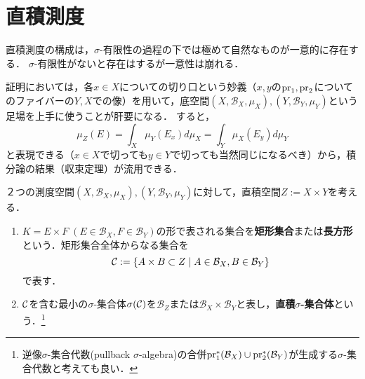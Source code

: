 \documentclass[uplatex, dvipdfmx]{jsreport}
\renewcommand{\B}{\mathcal{B}}
\begin{document}
\section{直積測度}

\begin{tcolorbox}[colframe=ForestGreen, colback=ForestGreen!10!white,breakable,colbacktitle=ForestGreen!40!white,coltitle=black,fonttitle=\bfseries\sffamily,
title=直積測度を積分形で捉える]
    直積測度の構成は，$\sigma$-有限性の過程の下では極めて自然なものが一意的に存在する．
    $\sigma$-有限性がないと存在はするが一意性は崩れる．

    証明においては，各$x\in X$についての切り口という妙義（$x,y$の$\mathrm{pr}_1,\mathrm{pr}_2$についてのファイバーの$Y,X$での像）を用いて，底空間$(X,\B_X,\mu_X),(Y,\B_Y,\mu_Y)$という足場を上手に使うことが肝要になる．
    すると，
    \[\mu_Z(E)=\int_X\mu_Y(E_x)d\mu_X=\int_Y\mu_X(E_y)d\mu_Y\]
    と表現できる（$x\in X$で切っても$y\in Y$で切っても当然同じになるべき）から，積分論の結果（収束定理）が流用できる．
\end{tcolorbox}

\begin{definition}
    ２つの測度空間$(X,\B_X,\mu_X),(Y,\B_Y,\mu_Y)$に対して，直積空間$Z:=X\times Y$を考える．
    \begin{enumerate}
        \item $K=E\times F\;(E\in\B_X,F\in\B_Y)$の形で表される集合を\textbf{矩形集合}または\textbf{長方形}という．矩形集合全体からなる集合を\[\cC:=\Brace{A\times B\subset Z\mid A\in\B_X,B\in\B_Y}\]で表す．
        \item $\mathcal{C}$を含む最小の$\sigma$-集合体$\sigma(\mathcal{C})$を$\B_Z$または$\B_X\times\B_Y$と表し，\textbf{直積$\sigma$-集合体}という．\footnote{逆像$\sigma$-集合代数(pullback $\sigma$-algebra)の合併$\pr_1^*(\B_X)\cup\pr_2^*(\B_Y)$が生成する$\sigma$-集合代数と考えても良い．}
    \end{enumerate}
\end{definition}
\end{document}
